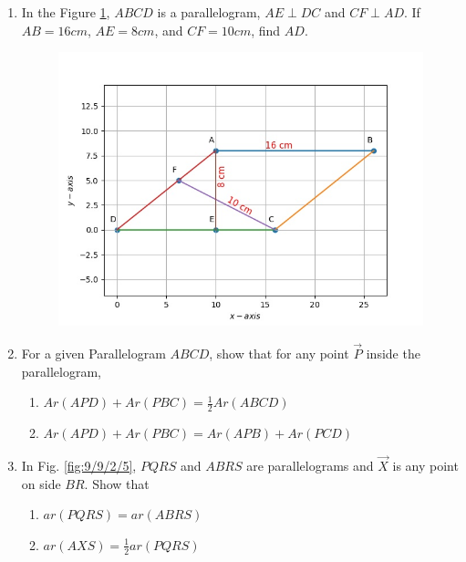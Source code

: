\begin{enumerate}[label=\thesection.\arabic*,ref=\thesection.\theenumi]
\item In the Figure \ref{fig:9/9/2/1}, $ABCD$ is a parallelogram, $AE \perp DC$ and $CF \perp AD$. If $AB = 16 cm$, $AE = 8 cm$, and $CF = 10cm$, find $AD$.
	\begin{figure}[!h]
		\centering
 \includegraphics[width=\columnwidth]{chapters/9/9/2/1/figs/fig1.pdf}
		\caption{}
		\label{fig:9/9/2/1}
  	\end{figure}

\item For a given Parallelogram $ABCD$, show that for any
point $\vec{P}$ inside the parallelogram,
\begin{enumerate}
	\item $Ar(APD)+Ar(PBC) = \frac{1}{2}Ar(ABCD)$
	\item $Ar(APD)+Ar(PBC) = Ar(APB)+Ar(PCD)$
\end{enumerate}

\item In Fig.
		\ref{fig:9/9/2/5},
$PQRS$ and $ABRS$ are parallelograms
and $\vec{X}$ is any point on side $BR$. Show that  
\begin{enumerate}
    \item $ar (PQRS) = ar(ABRS)$
	    \label{prop:9/9/2/5}
    \item $ar(AXS) = \frac{1}{2} ar(PQRS)$
\end{enumerate}
	\begin{figure}[!h]
		\centering

\end{figure}
\end{enumerate}
